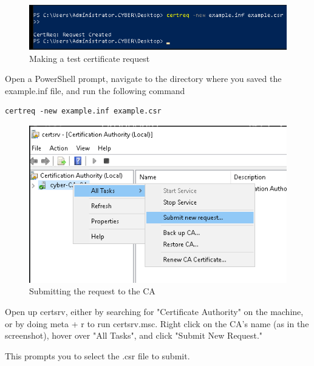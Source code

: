 \documentclass{article}
\begin{document}
\begin{figure}[H]
        \centering
        \includegraphics[width=1\textwidth]{MakingATestCertReq.png}
        \caption{Making a test certificate request}
        \label{fig:MakingATestCertReq}
\end{figure}

Open a PowerShell prompt, navigate to the directory where you saved the example.inf file, 
and run the following command
\begin{lstlisting}[breaklines=true, columns=fullflexible]
certreq -new example.inf example.csr
\end{lstlisting}

\begin{figure}[H]
        \centering
        \includegraphics[width=1\textwidth]{SubmitNewRequest.png}
        \caption{Submitting the request to the CA}
        \label{fig:SubmitNewRequest}
\end{figure}

Open up certsrv, either by searching for "Certificate Authority" on the machine,
or by doing meta + r to run certsrv.msc. Right click on the CA's name (as in the screenshot),
hover over "All Tasks", and click "Submit New Request."

This prompts you to select the .csr file to submit.
\end{document}

